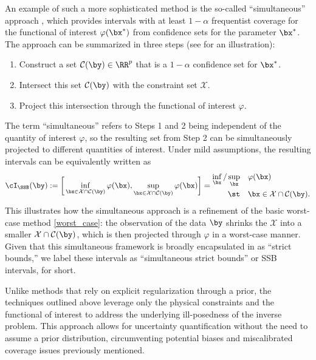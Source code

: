\documentclass[11pt]{article}
\numberwithin{equation}{section}
\numberwithin{figure}{section}
\begin{document}
An example of such a more sophisticated method is the so-called ``simultaneous'' approach \cite{stark_strict_bounds,stark1994simultaneous}, which provides intervals with at least $1-\alpha$ frequentist coverage for the functional of interest $\varphi(\bx^*)$ from confidence sets for the parameter $\bx^*$. 
The approach can be summarized in three steps (see  for an illustration): 
\begin{enumerate}[leftmargin=15mm]
    \setlength\itemsep{0em}
    \item[Step 1.] Construct a set $\mathcal{C}(\by) \in \RR^p$ that is a $1-\alpha$ confidence set for $\bx^*$.
    \item[Step 2.] Intersect this set $\mathcal{C}(\by)$ with the constraint set $\mathcal X$.
    \item[Step 3.] Project this intersection through the functional of interest $\varphi$.
\end{enumerate}
The term ``simultaneous'' refers to Steps 1 and 2 being independent of the quantity of interest $\varphi$, so the resulting set from Step 2 can be simultaneously projected to different quantities of interest. 
Under mild assumptions, the resulting intervals can be equivalently written as
\begin{equation}\label{simultaneous}
    \cI_{\SSB}(\by)
    :=
    \bigg [\inf_{\bx \in \mathcal X\cap \mathcal{C}(\by)} \varphi(\bx), \sup_{\bx \in \mathcal X \cap \mathcal{C}(\by)} \varphi(\bx) \bigg ] = \begin{aligned}
\inf_{\bx}/\sup_{\bx} \quad & \varphi(\bx) \\
\st \quad & \bx \in \mathcal X \cap \mathcal{C}(\by).
\end{aligned}
\end{equation}
This illustrates how the simultaneous approach is a refinement of the basic worst-case method \eqref{worst_case}: 
the observation of the data $\by$ shrinks the  $\mathcal X$ into a smaller  $\mathcal X \cap \mathcal{C}(\by)$, which is then projected through $\varphi$ in a worst-case manner. 
Given that this simultaneous framework is broadly encapsulated in \cite{stark_strict_bounds} as ``strict bounds,'' we label these intervals as ``simultaneous strict bounds'' or SSB intervals, for short.

Unlike methods that rely on explicit regularization through a prior, the techniques outlined above leverage only the physical constraints and the functional of interest to address the underlying ill-posedness of the inverse problem. 
This approach allows for uncertainty quantification without the need to assume a prior distribution, circumventing potential biases and miscalibrated coverage issues previously mentioned.
\end{document}
